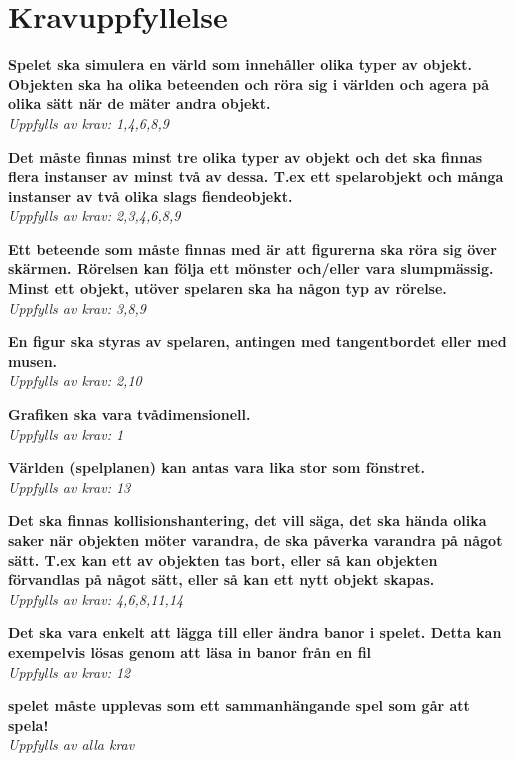 \documentclass{TDP005mall}
\begin{document}
\section{Kravuppfyllelse}

    \textbf{Spelet ska simulera en värld som innehåller olika typer av objekt. Objekten
    ska ha olika beteenden och röra sig i världen och agera på olika sätt när de
    mäter andra objekt.}\\
    \emph{Uppfylls av krav: 1,4,6,8,9}
    
    \textbf{ Det måste finnas minst tre olika typer av objekt och det ska finnas flera
    instanser av minst två av dessa. T.ex ett spelarobjekt och många instanser
    av två olika slags fiendeobjekt.}\\
    \emph{Uppfylls av krav: 2,3,4,6,8,9}
    
    \textbf{Ett beteende som måste finnas med är att figurerna ska röra sig över
    skärmen. Rörelsen kan följa ett mönster och/eller vara slumpmässig. Minst
    ett objekt, utöver spelaren ska ha någon typ av rörelse.}\\
    \emph{Uppfylls av krav: 3,8,9}
    
    \textbf{En figur ska styras av spelaren, antingen med tangentbordet eller med
    musen.}\\
    \emph{Uppfylls av krav: 2,10}
    
    \textbf{Grafiken ska vara tvådimensionell.}\\
    \emph{Uppfylls av krav: 1}
    
    \textbf{Världen (spelplanen) kan antas vara lika stor som fönstret.}\\
    \emph{Uppfylls av krav: 13}
    
    \textbf{Det ska finnas kollisionshantering, det vill säga, det ska hända olika saker
    när objekten möter varandra, de ska påverka varandra på något sätt. T.ex kan
    ett av objekten tas bort, eller så kan objekten förvandlas på något sätt,
    eller så kan ett nytt objekt skapas.}\\
    \emph{Uppfylls av krav: 4,6,8,11,14}
    
    \textbf{Det ska vara enkelt att lägga till eller ändra banor i spelet. Detta kan
      exempelvis lösas genom att läsa in banor från en fil}\\
    \emph{Uppfylls av krav: 12}
    
    
    \textbf{spelet måste upplevas som ett sammanhängande spel som går att
      spela!}\\
    \emph{Uppfylls av alla krav}
    
\end{document}
